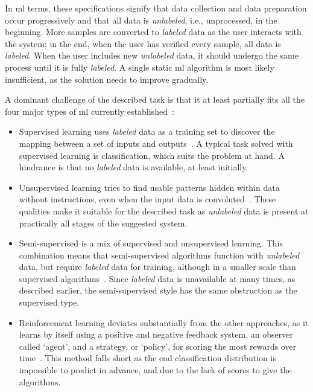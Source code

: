 In \gls{ml} terms, these specifications signify that data collection and data preparation occur progressively and that all data is \emph{unlabeled}, i.e., unprocessed, in the beginning. More samples are converted to \emph{labeled} data as the user interacts with the system; in the end, when the user has verified every sample, all data is \emph{labeled}. When the user includes new \emph{unlabeled} data, it should undergo the same process until it is fully \emph{labeled}. A single static \gls{ml} algorithm is most likely insufficient, as the solution needs to improve gradually.

A dominant challenge of the described task is that it at least partially fits all the four major types of \gls{ml} currently established~\cite[30]{book:hands-on_machine_learning_with_scikit-learn_&_tensorflow}:

\begin{itemize}
    \item Supervised learning uses \emph{labeled} data as a training set to discover the mapping between a set of inputs and outputs~\cite[30]{book:hands-on_machine_learning_with_scikit-learn_&_tensorflow}. A typical task solved with supervised learning is classification, which suits the problem at hand. A hindrance is that no \emph{labeled} data is available, at least initially.
    \item Unsupervised learning tries to find usable patterns hidden within data without instructions, even when the input data is convoluted~\cite[32]{book:hands-on_machine_learning_with_scikit-learn_&_tensorflow}. These qualities make it suitable for the described task as \emph{unlabeled} data is present at practically all stages of the suggested system.
    \item Semi-supervised is a mix of supervised and unsupervised learning. This combination means that semi-supervised algorithms function with \emph{unlabeled} data, but require \emph{labeled} data for training, although in a smaller scale than supervised algorithms~\cite[35]{book:hands-on_machine_learning_with_scikit-learn_&_tensorflow}. Since \emph{labeled} data is unavailable at many times, as described earlier, the semi-supervised style has the same obstruction as the supervised type.
    \item Reinforcement learning deviates substantially from the other approaches, as it learns by itself using a positive and negative feedback system, an observer called `agent', and a strategy, or `policy', for scoring the most rewards over time~\cite[35]{book:hands-on_machine_learning_with_scikit-learn_&_tensorflow}. This method falls short as the end classification distribution is impossible to predict in advance, and due to the lack of scores to give the algorithms.
\end{itemize}

